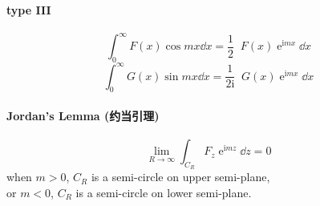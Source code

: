 \documentclass[UTF8]{ctexart} %
\DeclareMathOperator{\intdinf}{\int_{-\infty}^\infty}
\DeclareMathOperator{\e}{\mathrm{e}}
\renewcommand{\I}{\mathrm{i}}
\DeclareMathOperator{\ra}{\rightarrow}
\numberwithin{equation}{section}
\begin{document}
\paragraph{type III}
\begin{equation}\label{key}
\int_0^\infty F(x)\cos mx\dd x = \dfrac{1}{2}\intdinf F(x)\e^{\I mx}\dd x
\end{equation}
\begin{equation}\label{key}
\int_0^\infty G(x)\sin mx\dd x = \dfrac{1}{2\I}\intdinf G(x)\e^{\I mx}\dd x
\end{equation}
\paragraph{Jordan's Lemma (约当引理)}
\begin{equation}\label{key}
\lim_{R\ra\infty}\int_{C_R} F_z\e^{\I mz}\dd z = 0
\end{equation}
when $m>0$, $C_R$ is a semi-circle on upper semi-plane,\\
or $m<0$, $C_R$ is a semi-circle on lower semi-plane.
\end{document}
